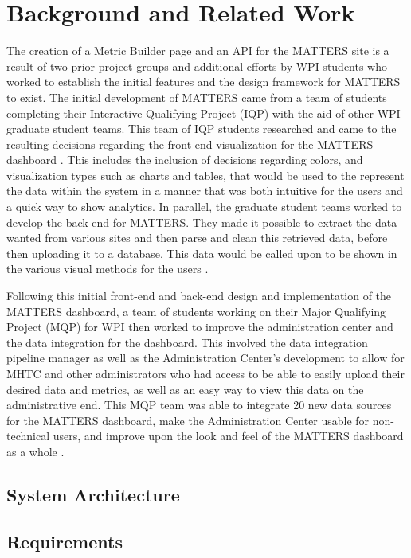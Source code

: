 \chapter{Background and Related Work}

	The creation of a Metric Builder page and an API for the MATTERS site is a 
	result of two prior project groups and additional efforts by WPI students 
	who worked to establish the initial features and the design framework for 
	MATTERS to exist. The initial development of MATTERS came from a team of 
	students completing their Interactive Qualifying Project (IQP) with the 
	aid of other WPI graduate student teams. This team of IQP students researched 
	and came to the resulting decisions regarding the front-end visualization for 
	the MATTERS dashboard \cite{prevreport}. This includes the inclusion of decisions 
	regarding colors, and visualization types such as charts and tables, that would 
	be used to the represent the data within the system in a manner that was both 
	intuitive for the users and a quick way to show analytics. In parallel, 
	the graduate student teams worked to develop the back-end for MATTERS. 
	They made it possible to extract the data wanted from various sites and 
	then parse and clean this retrieved data, before then uploading it to a 
	database. This data would be called upon to be shown in the various visual 
	methods for the users \cite{iqp}.

	Following this initial front-end and back-end design and implementation 
	of the MATTERS dashboard, a team of students working on their Major Qualifying 
	Project (MQP) for WPI then worked to improve the administration center and the 
	data integration for the dashboard. This involved the data integration pipeline 
	manager as well as the Administration Center's development to allow for MHTC 
	and other administrators who had access to be able to easily upload their 
	desired data and metrics, as well as an easy way to view this data on the 
	administrative end. This MQP team was able to integrate 20 new data sources 
	for the MATTERS dashboard, make the Administration Center usable for 
	non-technical users, and improve upon the look and feel of the MATTERS 
	dashboard as a whole \cite{iqp}.

	\section{System Architecture}

	\section{Requirements}


